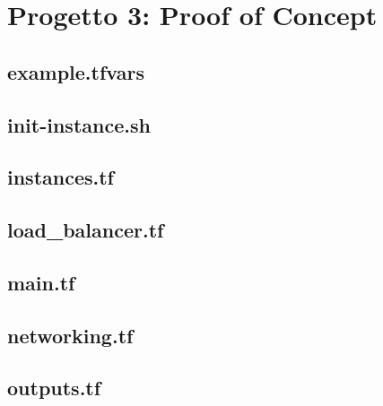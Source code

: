 \section{Progetto 3: Proof of Concept}\label{app:tf_proj3}

\subsection{example.tfvars}

\subsection{init-instance.sh}

\subsection{instances.tf}

\subsection{load\_balancer.tf}

\subsection{main.tf}

\subsection{networking.tf}

\subsection{outputs.tf}


